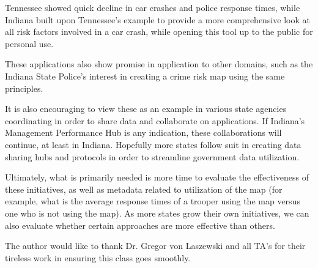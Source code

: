 \documentclass[sigconf]{acmart}
\begin{document}
Tennessee showed quick decline in car crashes and police response times, while Indiana built upon Tennessee's example to provide a more comprehensive look at all risk factors involved in a car crash, while opening this tool up to the public for personal use. 

These applications also show promise in application to other domains, such as the Indiana State Police's interest in creating a crime risk map using the same principles. 

It is also encouraging to view these as an example in various state agencies coordinating in order to share data and collaborate on applications. If Indiana's Management Performance Hub is any indication, these collaborations will continue, at least in Indiana. Hopefully more states follow suit in creating data sharing hubs and protocols in order to streamline government data utilization.

Ultimately, what is primarily needed is more time to evaluate the effectiveness of these initiatives, as well as metadata related to utilization of the map (for example, what is the average response times of a trooper using the map versus one who is not using the map). As more states grow their own initiatives, we can also evaluate whether certain approaches are more effective than others.

\begin{acks}

  The author would like to thank Dr. Gregor von Laszewski and all TA's for their tireless work in ensuring this class goes smoothly.

\end{acks}


 
\end{document}
